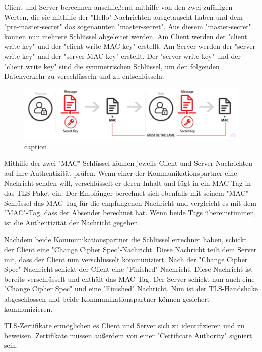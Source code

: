 Client und Server berechnen anschließend mithilfe von den zwei zufälligen Werten, die sie mithilfe der "Hello"-Nachrichten ausgetauscht haben und dem "pre-master-secret" das sogenannten "master-secret". Aus diesem "master-secret" können nun mehrere Schlüssel abgeleitet werden. Am Client werden der "client write key" und der "client write MAC key" erstellt. Am Server werden der "server write key" und der "server MAC key" erstellt. Der "server write key" und der "client write key" sind die symmetrischen Schlüssel, um den folgenden Datenverkehr zu verschlüsseln und zu entschlüsseln.

\begin{figure}[H]
    \centering
    \includegraphics{media/OpenSSL/key.png}
    \caption{caption} %
\end{figure}

Mithilfe der zwei "MAC"-Schlüssel können jeweils Client und Server Nachrichten auf ihre Authentizität prüfen. Wenn einer der Kommunikationspartner eine Nachricht senden will, verschlüsselt er deren Inhalt und fügt in ein MAC-Tag in das TLS-Paket ein. Der Empfänger berechnet sich ebenfalls mit seinem "MAC"-Schlüssel das MAC-Tag für die empfangenen Nachricht und vergleicht es mit dem "MAC"-Tag, dass der Absender berechnet hat. Wenn beide Tags übereinstimmen, ist die Authentizität der Nachricht gegeben.

Nachdem beide Kommunikationspartner die Schlüssel errechnet haben, schickt der Client eine "Change Cipher Spec"-Nachricht. Diese Nachricht teilt dem Server mit, dass der Client nun verschlüsselt kommuniziert. Nach der "Change Cipher Spec"-Nachricht schickt der Client eine "Finished"-Nachricht. Diese Nachricht ist bereits verschlüsselt und enthält das MAC-Tag. Der Server schickt nun auch eine "Change Cipher Spec" und eine "Finished" Nachricht. Nun ist der TLS-Handshake abgeschlossen und beide Kommunikationspartner können gesichert kommunizieren.


TLS-Zertifikate ermöglichen es Client und Server sich zu identifizieren und zu beweisen. Zertifikate müssen außerdem von einer "Certificate Authority" signiert sein. 

